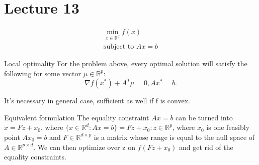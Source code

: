 \documentclass[a4paper]{article}
\begin{document}
\section{Lecture 13}\vspace{-0.5cm}
\begin{align*}
    \underset{x\in \mathbb{R}^d}{\min} f(x)\\
    \text{subject to } Ax = b
\end{align*}
\begin{subbox}{Local optimality}
For the problem above, every optimal solution will satisfy the following for some vector $\mu\in \mathbb{R}^p$: \[
\nabla f(x^*) + A^T \mu = 0, Ax^* = b
.\]  
\end{subbox} 
It's necessary in general case, sufficient as well if f is convex.

\begin{mainbox}{Equivalent formulation}
    The equality constraint $Ax=b$ can be turned into $x = Fz + x_0$, where $\{x\in \mathbb{R}^d: Ax= b \} = {Fz + x_0: z\in \mathbb{R}^p}$, where $x_0$ is one feasibly point $Ax_0 = b$ and $F\in\mathbb{R}^{d\times p}$ is a matrix whose range is equal to the null space of $A\in\mathbb{R}^{p\times d}$. We can then optimize over z on $f(Fz + x_0)$ and get rid of the equality constraints.        
\end{mainbox}
\end{document}
